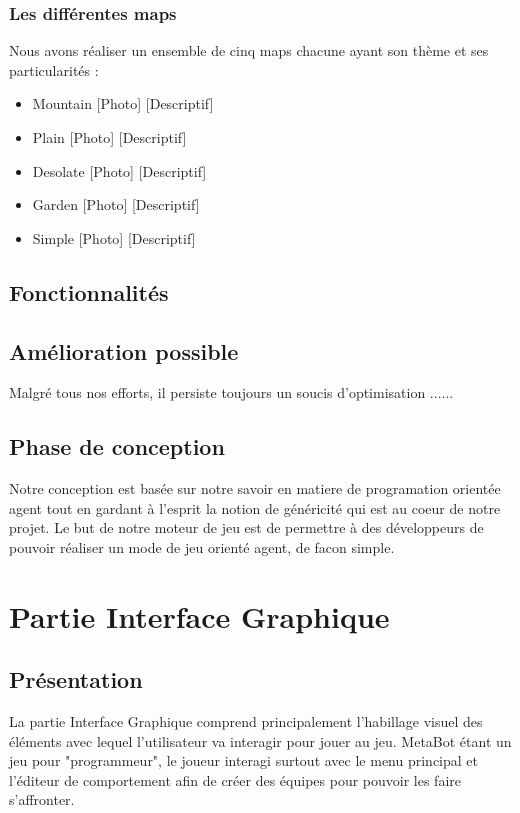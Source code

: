 \documentclass{report}
\begin{document}
\subsection{Les différentes maps}

Nous avons réaliser un ensemble de cinq maps chacune ayant son thème et ses particularités :
\begin{itemize}
\item Mountain
[Photo]
[Descriptif]
\item Plain
[Photo]
[Descriptif]
\item Desolate
[Photo]
[Descriptif]
\item Garden
[Photo]
[Descriptif]
\item Simple
[Photo]
[Descriptif]
\end{itemize}

\section{Fonctionnalités}



\section{Amélioration possible}

Malgré tous nos efforts, il persiste toujours un soucis d'optimisation ......

\section{Phase de conception}
Notre conception est basée sur notre savoir en matiere de programation orientée agent tout en gardant à l'esprit la notion de généricité qui est au coeur de notre projet.
Le but de notre moteur de jeu est de permettre à des développeurs de pouvoir réaliser un mode de jeu orienté agent, de facon simple.
\newpage
\chapter{Partie Interface Graphique}
\section{Présentation}
La partie Interface Graphique comprend principalement l'habillage visuel des éléments avec lequel l'utilisateur va interagir pour jouer au jeu. MetaBot étant un jeu pour "programmeur", le joueur interagi surtout avec le menu principal et l'éditeur de comportement afin de créer des équipes pour pouvoir les faire s'affronter.
\end{document}
